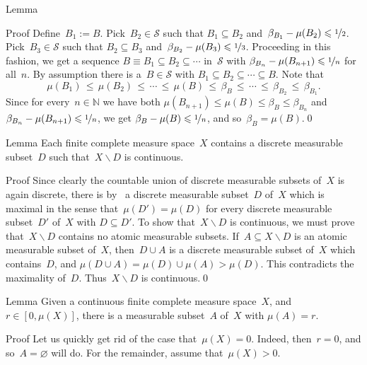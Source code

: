 \documentclass[a]{subfiles}
\begin{document}
\begin{parsec}
\begin{point}{Lemma}
\begin{point}{Proof}
Define~$B_1:= B$.
Pick~$B_2\in\mathcal{S}$
such that $B_1 \subseteq B_2$
and~$\beta_{B_1}-\mu(B_2)\leq \nicefrac{1}{2}$.
Pick~$B_3\in\mathcal{S}$
such that $B_2\subseteq B_3$
and~$\beta_{B_2}-\mu(B_3) \leq \nicefrac{1}{3}$.
Proceeding in this fashion,
we get a sequence $B\equiv B_1\subseteq B_2 \subseteq \dotsb$
in~$\mathcal{S}$
with $\beta_{B_{n}}-\mu(B_{n+1})\leq \nicefrac{1}{n}$
for all~$n$.
By assumption there is a~$B\in\mathcal{S}$
with $B_1\subseteq B_2\subseteq \dotsb \subseteq B$.
Note that
\begin{equation*}
\mu(B_1)\,\leq\, \mu(B_2)\,\leq\,
\dotsb \,\leq\,\mu(B)\,\leq\, \beta_B \,\leq\, \dotsb
\,\leq\, \beta_{B_2}\,\leq\, \beta_{B_1}.
\end{equation*}
Since for every~$n\in\mathbb{N}$
we have both $\mu(B_{n+1})\leq \mu(B)\leq \beta_B \leq \beta_{B_n}$
and $\beta_{B_n}- \mu(B_{n+1}) \leq \nicefrac{1}{n}$,
we get $\beta_B-\mu(B)\leq \nicefrac{1}{n}$,
and so~$\beta_B = \mu(B)$.\qed
\end{point}
\end{point}

\begin{point}{Lemma}%
Each finite complete  measure space~$X$ 
contains a  discrete measurable  subset~$D$
such that~$X\backslash D$ is continuous.
\begin{point}{Proof}%
Since clearly the countable union
of discrete measurable subsets of~$X$
is again discrete,
there is by~
a discrete measurable subset~$D$ of~$X$
which is maximal in the sense that~$\mu(D')=\mu(D)$
for every discrete measurable subset~$D'$ of~$X$ with $D\subseteq D'$.
To show that~$X\backslash D$ is continuous,
we must prove that~$X\backslash D$
contains no atomic measurable subsets.
If~$A\subseteq X\backslash D$ is an atomic measurable subset
of~$X$,
then~$D\cup A$
is a discrete measurable
subset of~$X$
which contains~$D$,
and $\mu(D\cup A)=\mu(D)\cup \mu(A) > \mu(D)$.
This contradicts the  maximality of~$D$.
Thus~$X\backslash D$ is continuous.\qed
\end{point}
\end{point}
\begin{point}{Lemma}%
Given a continuous finite complete measure space~$X$,
and~$r\in [0,\mu(X)]$,
there is a measurable subset~$A$ of~$X$ with $\mu(A)=r$.
\begin{point}{Proof}%
Let us quickly get rid of the case that~$\mu(X)=0$.
Indeed, then~$r=0$, and so~$A=\varnothing$ will do.
For the remainder, assume that~$\mu(X)>0$.


\end{point}
\end{point}
\end{parsec}
\end{document}
